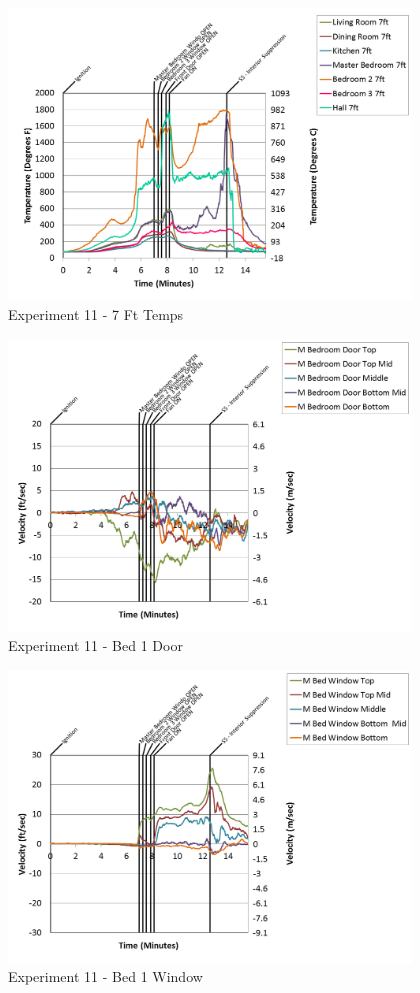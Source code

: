 \documentclass{article}
\begin{document}
\begin{appendices}
\begin{figure}[h!]
	\centering
	\includegraphics[height=3.05in]{0_Images/Results_Charts/Exp_11_Charts/7FtTemps.png}
	\caption{Experiment 11 - 7 Ft Temps}
\end{figure}

\clearpage

\begin{figure}[h!]
	\centering
	\includegraphics[height=3.05in]{0_Images/Results_Charts/Exp_11_Charts/Bed1Door.png}
	\caption{Experiment 11 - Bed 1 Door}
\end{figure}


\begin{figure}[h!]
	\centering
	\includegraphics[height=3.05in]{0_Images/Results_Charts/Exp_11_Charts/Bed1Window.png}
	\caption{Experiment 11 - Bed 1 Window}
\end{figure}


\end{appendices}
\end{document}
